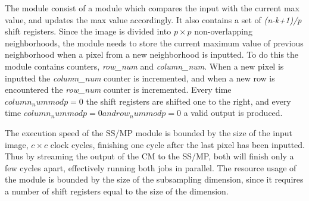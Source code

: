 The module consist of a module which compares the input with the current max value, and updates the max value accordingly. It also contains a set of \textit{(n-k+1)/p} shift registers. Since the image is divided into $ p \times p $ non-overlapping neighborhoods, the module needs to store the current maximum value of previous neighborhood when a pixel from a new neighborhood is inputted. To do this the module contains counters, \textit{row\_num} and \textit{column\_num}. When a new pixel is inputted the \textit{column\_num} counter is incremented, and when a new row is encountered the \textit{row\_num} counter is incremented. Every time $ column_num mod p = 0 $ the shift registers are shifted one to the right, and every time $ column_num mod p = 0 and row_num mod p = 0 $ a valid output is produced. 

The execution speed of the SS/MP module is bounded by the size of the input image, $ c \times c $ clock cycles, finishing one cycle after the last pixel has been inputted. 
Thus by streaming the output of the CM to the SS/MP, both will finish only a few cycles apart, effectively running both jobs in parallel. The resource usage of the module is bounded by the size of the subsampling dimension, since it requires a number of shift registers equal to the size of the dimension. 